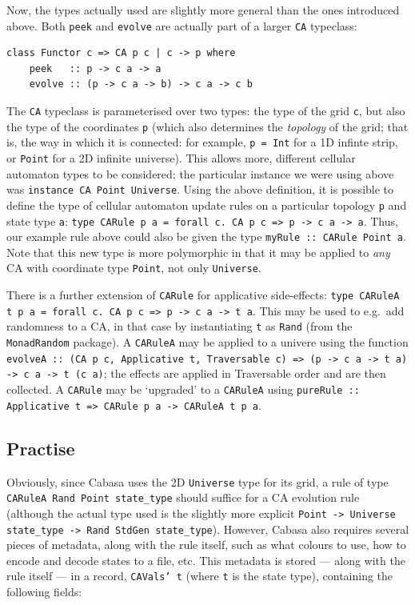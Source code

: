 \documentclass[oneside,a4paper]{memoir}
\begin{document}
Now, the types actually used are slightly more general than the ones introduced above.
Both \texttt{peek} and \texttt{evolve} are actually part of a larger \texttt{CA} typeclass:

\begin{verbatim}
class Functor c => CA p c | c -> p where
    peek   :: p -> c a -> a
    evolve :: (p -> c a -> b) -> c a -> c b
\end{verbatim}

The \texttt{CA} typeclass is parameterised over two types:
  the type of the grid \texttt{c},
  but also the type of the coordinates \texttt{p}
  (which also determines the \emph{topology} of the grid; that is, the way in which it is connected:
    for example, \texttt{p = Int} for a 1D infinte strip, or \texttt{Point} for a 2D infinite universe).
This allows more, different cellular automaton types to be considered;
  the particular instance we were using above was \texttt{instance~CA Point Universe}.
Using the above definition, it is possible to define the type of cellular automaton update rules
  on a particular topology \texttt{p} and state type \texttt{a}:
  \texttt{type CARule p a = forall c. CA p c => p -> c a -> a}.
Thus, our example rule above could also be given the type \texttt{myRule :: CARule Point a}.
Note that this new type is more polymorphic
  in that it may be applied to \textit{any} CA with coordinate type \texttt{Point},
  not only \texttt{Universe}.

There is a further extension of \texttt{CARule} for applicative side-effects:
  \texttt{type CARuleA t p a = forall c. CA p c => p -> c a -> t a}.
This may be used to e.g.\ add randomness to a CA,
  in that case by instantiating \texttt{t} as \texttt{Rand} (from the \texttt{MonadRandom} package).
A \texttt{CARuleA} may be applied to a univere using the function
  \texttt{evolveA :: (CA p c, Applicative t, Traversable c) => (p -> c a -> t a) -> c a -> t (c a)};
  the effects are applied in Traversable order and are then collected.
A \texttt{CARule} may be `upgraded' to a \texttt{CARuleA} using \texttt{pureRule :: Applicative t => CARule p a -> CARuleA t p a}.

\subsection{Practise}
\label{sec:hspr}

Obviously, since Cabasa uses the 2D \texttt{Universe} type for its grid,
  a rule of type \texttt{CARuleA Rand Point state\_type} should suffice for a CA evolution rule
  (although the actual type used is the slightly more explicit
    \texttt{Point -> Universe state\_type -> Rand StdGen state\_type}).
However, Cabasa also requires several pieces of metadata, along with the rule itself,
  such as what colours to use, how to encode and decode states to a file, etc.
This metadata is stored --- along with the rule itself --- in a record, \texttt{CAVals' t}
  (where \texttt{t} is the state type),
  containing the following fields:
\end{document}
